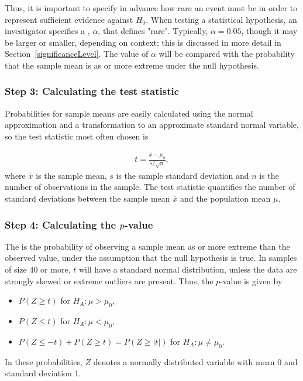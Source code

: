 \begin{spacing}{1.5}
Thus, it is important to specify in advance how rare an event must be in order to represent sufficient evidence against $H_0$. When testing a statistical hypothesis, an investigator specifies a , $\alpha$, that defines "rare". Typically, $\alpha = 0.05$, though it may be larger or smaller, depending on context; this is discussed in more detail in Section~\ref{significanceLevel}. The value of $\alpha$ will be compared with the probability that the sample mean is as or more extreme under the null hypothesis.

\subsubsection{Step 3: Calculating the test statistic}

Probabilities for sample means are easily calculated using the normal approximation and a transformation to an approximate standard normal variable, so the test statistic most often chosen is 

\begin{align}
t=\frac{\overline{x}-\mu_0}{s/\sqrt{n}},
\end{align}
where $\overline{x}$ is the sample mean, $s$ is the sample standard deviation and $n$ is the number of observations in the sample. The test statistic quantifies the number of standard deviations between the sample mean $\overline{x}$ and the population mean $\mu$.

\subsubsection{Step 4: Calculating the $p$-value}

The  is the probability of observing a sample mean as or more extreme than the observed value, under the assumption that the null hypothesis is true. In samples of size 40 or more, $t$ will have a standard normal distribution, unless the data are strongly skewed or extreme outliers are present. Thus, the $p$-value is given by

\begin{itemize}
	\item $P(Z \geq t)$ for $H_A: \mu > \mu_0$,
	
	\item $P(Z \leq t)$ for $H_A: \mu < \mu_0$,
	
	\item $P(Z \leq -t) + P(Z \geq t) = P(Z \geq |t| )$ for $H_A: \mu \neq \mu_0.$
\end{itemize}
In these probabilities, $Z$ denotes a normally distributed variable with mean 0 and standard deviation 1.


\end{spacing}

